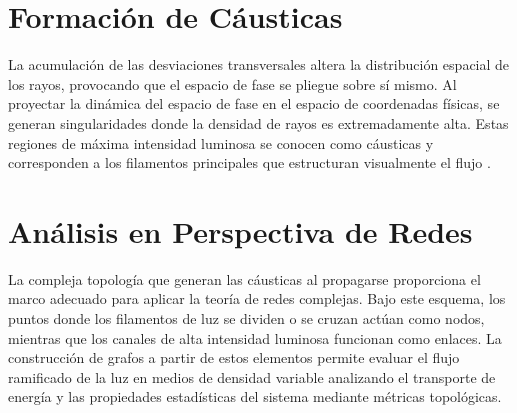 \section{Formación de Cáusticas}
La acumulación de las desviaciones transversales altera la distribución espacial de los rayos, provocando que el espacio de fase se pliegue sobre sí mismo. Al proyectar la dinámica del espacio de fase en el espacio de coordenadas físicas, se generan singularidades donde la densidad de rayos es extremadamente alta. Estas regiones de máxima intensidad luminosa se conocen como cáusticas y corresponden a los filamentos principales que estructuran visualmente el flujo \cite{metzger2010branched}.

\section{Análisis en Perspectiva de Redes}
La compleja topología que generan las cáusticas al propagarse proporciona el marco adecuado para aplicar la teoría de redes complejas. Bajo este esquema, los puntos donde los filamentos de luz se dividen o se cruzan actúan como nodos, mientras que los canales de alta intensidad luminosa funcionan como enlaces. La construcción de grafos a partir de estos elementos permite evaluar el flujo ramificado de la luz en medios de densidad variable analizando el transporte de energía y las propiedades estadísticas del sistema mediante métricas topológicas.